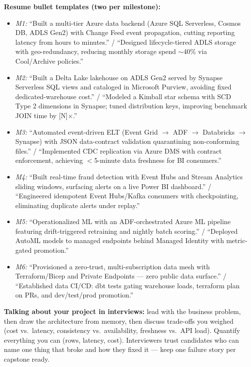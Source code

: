 \documentclass[11pt, a4paper]{article}
\begin{document}
\textbf{Resume bullet templates (two per milestone):}
\begin{itemize}[label=-]
    \item \textit{M1:} ``Built a multi-tier Azure data backend (Azure SQL Serverless, Cosmos DB, ADLS Gen2) with Change Feed event propagation, cutting reporting latency from hours to minutes.'' / ``Designed lifecycle-tiered ADLS storage with geo-redundancy, reducing monthly storage spend $\sim$40\% via Cool/Archive policies.''
    \item \textit{M2:} ``Built a Delta Lake lakehouse on ADLS Gen2 served by Synapse Serverless SQL views and cataloged in Microsoft Purview, avoiding fixed dedicated-warehouse cost.'' / ``Modeled a Kimball star schema with SCD Type 2 dimensions in Synapse; tuned distribution keys, improving benchmark JOIN time by [N]$\times$.''
    \item \textit{M3:} ``Automated event-driven ELT (Event Grid $\rightarrow$ ADF $\rightarrow$ Databricks $\rightarrow$ Synapse) with JSON data-contract validation quarantining non-conforming files.'' / ``Implemented CDC replication via Azure DMS with contract enforcement, achieving $<$5-minute data freshness for BI consumers.''
    \item \textit{M4:} ``Built real-time fraud detection with Event Hubs and Stream Analytics sliding windows, surfacing alerts on a live Power BI dashboard.'' / ``Engineered idempotent Event Hubs/Kafka consumers with checkpointing, eliminating duplicate alerts under replay.''
    \item \textit{M5:} ``Operationalized ML with an ADF-orchestrated Azure ML pipeline featuring drift-triggered retraining and nightly batch scoring.'' / ``Deployed AutoML models to managed endpoints behind Managed Identity with metric-gated promotion.''
    \item \textit{M6:} ``Provisioned a zero-trust, multi-subscription data mesh with Terraform/Bicep and Private Endpoints --- zero public data surface.'' / ``Established data CI/CD: dbt tests gating warehouse loads, terraform plan on PRs, and dev/test/prod promotion.''
\end{itemize}

\textbf{Talking about your project in interviews:} lead with the business problem, then draw the architecture from memory, then discuss trade-offs you weighed (cost vs.\ latency, consistency vs.\ availability, freshness vs.\ API load). Quantify everything you can (rows, latency, cost). Interviewers trust candidates who can name one thing that broke and how they fixed it --- keep one failure story per capstone ready.
\end{document}
